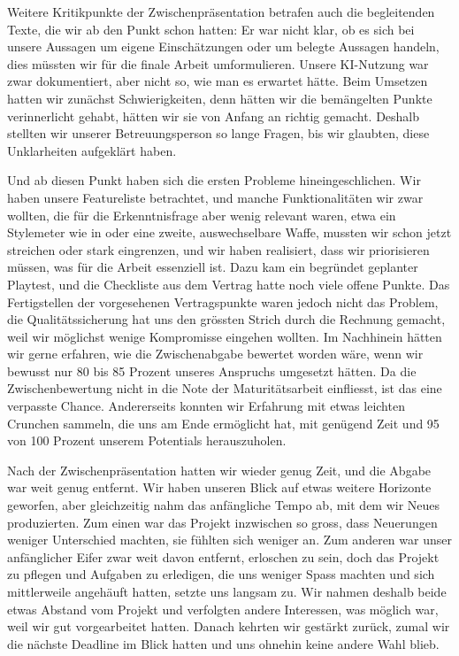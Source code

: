 \documentclass[../Main.tex]{subfiles}
\begin{document}
Weitere Kritikpunkte der Zwischenpräsentation betrafen auch die begleitenden Texte, die wir ab den Punkt schon hatten: Er war nicht klar, ob es sich bei unsere Aussagen um eigene Einschätzungen oder um belegte Aussagen handeln, dies müssten wir für die finale Arbeit umformulieren. Unsere KI-Nutzung war zwar dokumentiert, aber nicht so, wie man es erwartet hätte. Beim Umsetzen hatten wir zunächst Schwierigkeiten, denn hätten wir die bemängelten Punkte verinnerlicht gehabt, hätten wir sie von Anfang an richtig gemacht. Deshalb stellten wir unserer Betreuungsperson so lange Fragen, bis wir glaubten, diese Unklarheiten aufgeklärt haben.

Und ab diesen Punkt haben sich die ersten Probleme hineingeschlichen. Wir haben unsere Featureliste betrachtet, und manche Funktionalitäten wir zwar wollten, die für die Erkenntnisfrage aber wenig relevant waren, etwa ein Stylemeter wie in \autocite{capcom_devilmaycry_2001} oder eine zweite, auswechselbare Waffe, mussten wir schon jetzt streichen oder stark eingrenzen, und wir haben realisiert, dass wir priorisieren müssen, was für die Arbeit essenziell ist. Dazu kam ein begründet geplanter Playtest, und die Checkliste aus dem Vertrag hatte noch viele offene Punkte. Das Fertigstellen der vorgesehenen Vertragspunkte waren jedoch nicht das Problem, die Qualitätssicherung hat uns den grössten Strich durch die Rechnung gemacht, weil wir möglichst wenige Kompromisse eingehen wollten. Im Nachhinein hätten wir gerne erfahren, wie die Zwischenabgabe bewertet worden wäre, wenn wir bewusst nur 80 bis 85 Prozent unseres Anspruchs umgesetzt hätten. Da die Zwischenbewertung nicht in die Note der Maturitätsarbeit einfliesst, ist das eine verpasste Chance. Andererseits konnten wir Erfahrung mit etwas leichten Crunchen sammeln, die uns am Ende ermöglicht hat, mit genügend Zeit und 95 von 100 Prozent unserem Potentials herauszuholen.

Nach der Zwischenpräsentation hatten wir wieder genug Zeit, und die Abgabe war weit genug entfernt. Wir haben unseren Blick auf etwas weitere Horizonte geworfen, aber gleichzeitig nahm das anfängliche Tempo ab, mit dem wir Neues produzierten. Zum einen war das Projekt inzwischen so gross, dass Neuerungen weniger Unterschied machten, sie fühlten sich weniger an. Zum anderen war unser anfänglicher Eifer zwar weit davon entfernt, erloschen zu sein, doch das Projekt zu pflegen und Aufgaben zu erledigen, die uns weniger Spass machten und sich mittlerweile angehäuft hatten, setzte uns langsam zu. Wir nahmen deshalb beide etwas Abstand vom Projekt und verfolgten andere Interessen, was möglich war, weil wir gut vorgearbeitet hatten. Danach kehrten wir gestärkt zurück, zumal wir die nächste Deadline im Blick hatten und uns ohnehin keine andere Wahl blieb.
\end{document}
